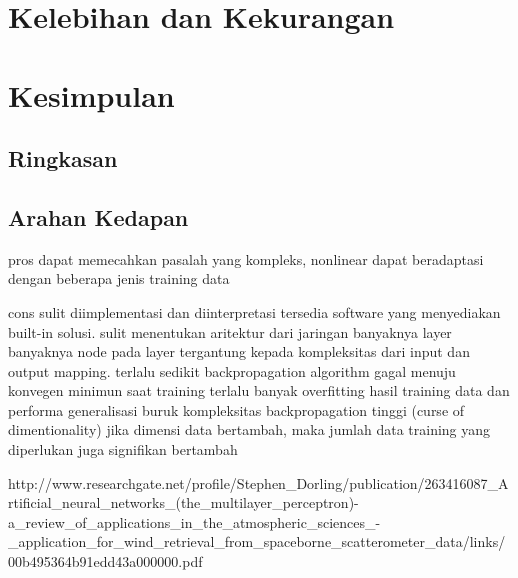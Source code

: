 
\section{Kelebihan dan Kekurangan}
\lipsum

\section{Kesimpulan}

	\subsection{Ringkasan}
	\lipsum[1]

	\subsection{Arahan Kedapan}
	\lipsum[1]


pros 
	dapat memecahkan pasalah yang kompleks, nonlinear
	dapat beradaptasi dengan beberapa jenis training data

cons 
sulit diimplementasi dan diinterpretasi
	tersedia software yang menyediakan built-in solusi.
sulit menentukan aritektur dari jaringan
	banyaknya layer
	banyaknya node pada layer
		tergantung kepada kompleksitas dari input dan output mapping. 
		terlalu sedikit backpropagation algorithm gagal menuju konvegen minimun saat training 
		terlalu banyak overfitting hasil training data dan performa generalisasi buruk
kompleksitas backpropagation tinggi (curse of dimentionality)
	jika dimensi data bertambah, maka jumlah data training yang diperlukan juga signifikan bertambah


	http://www.researchgate.net/profile/Stephen_Dorling/publication/263416087_Artificial_neural_networks_(the_multilayer_perceptron)-a_review_of_applications_in_the_atmospheric_sciences_-_application_for_wind_retrieval_from_spaceborne_scatterometer_data/links/00b495364b91edd43a000000.pdf

